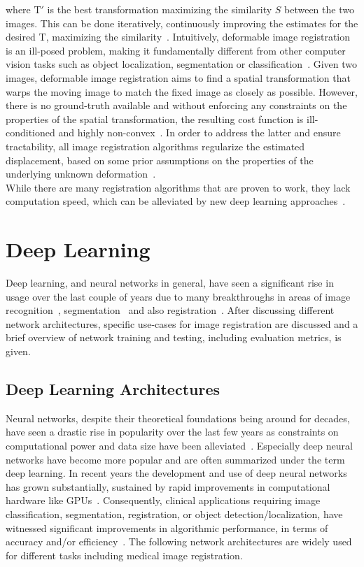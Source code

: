where $\text{T}'$ is the best transformation maximizing the similarity $S$ between the two images. This can be done iteratively, continuously improving the estimates for the desired T, maximizing the similarity~\cite{Chen2020}. Intuitively, deformable image registration is an ill-posed problem, making it fundamentally different from other computer vision tasks such as object localization, segmentation or classification~\cite{Fu2020}. Given two images, deformable image registration aims to find a spatial transformation that warps the moving image to match the fixed image as closely as possible. However, there is no ground-truth available and without enforcing any constraints on the properties of the spatial transformation, the resulting cost function is ill-conditioned and highly non-convex~\cite{Chen2020}. In order to address the latter and ensure tractability, all image registration algorithms regularize the estimated displacement, based on some prior assumptions on the properties of the underlying unknown deformation~\cite{Chen2020}. \\
While there are many registration algorithms that are proven to work,  they lack computation speed, which can be alleviated by new deep learning approaches~\cite{Fu2020}.


\section{Deep Learning} \label{Sec:DeepLearning}
Deep learning, and neural networks in general, have seen a significant rise in usage over the last couple of years due to many breakthroughs in areas of image recognition~\cite{Xu2023}, segmentation~\cite{U-Net} and also registration~\cite{Voxelmorph}. After discussing different network architectures, specific use-cases for image registration are discussed and a brief overview of network training and testing, including evaluation metrics, is given.

\subsection{Deep Learning Architectures} \label{SubSec:DeepLearningArchitectures}
Neural networks, despite their theoretical foundations being around for decades, have seen a drastic rise in popularity over the last few years as constraints on computational power and data size have been alleviated~\cite{Chen2020}. Especially deep neural networks have become more popular and are often summarized under the term deep learning. In recent years the development and use of deep neural networks has grown substantially, sustained by rapid improvements in computational hardware like GPUs~\cite{Chen2023}. Consequently, clinical applications requiring image classification, segmentation, registration, or object detection/localization, have witnessed significant improvements in algorithmic performance, in terms of accuracy and/or efficiency~\cite{Chen2020}. The following network architectures are widely used for different tasks including medical image registration.

